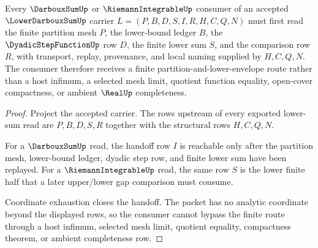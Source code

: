 \begin{theorem}\label{thm:lower-darboux-sum-finite-partition-handoff}
Every $\DarbouxSumUp$ or $\RiemannIntegrableUp$ consumer of an accepted $\LowerDarbouxSumUp$ carrier $L=(P,B,D,S,I,R,H,C,Q,N)$ must first read the finite partition mesh $P$, the lower-bound ledger $B$, the $\DyadicStepFunctionUp$ row $D$, the finite lower sum $S$, and the comparison row $R$, with transport, replay, provenance, and local naming supplied by $H,C,Q,N$. The consumer therefore receives a finite partition-and-lower-envelope route rather than a host infimum, a selected mesh limit, quotient function equality, open-cover compactness, or ambient $\RealUp$ completeness.
\end{theorem}
\begin{proof}
Project the accepted carrier. The rows upstream of every exported lower-sum read are $P,B,D,S,R$ together with the structural rows $H,C,Q,N$.

For a $\DarbouxSumUp$ read, the handoff row $I$ is reachable only after the partition mesh, lower-bound ledger, dyadic step row, and finite lower sum have been replayed. For a $\RiemannIntegrableUp$ read, the same row $S$ is the lower finite half that a later upper/lower gap comparison must consume.

Coordinate exhaustion closes the handoff. The packet has no analytic coordinate beyond the displayed rows, so the consumer cannot bypass the finite route through a host infimum, selected mesh limit, quotient equality, compactness theorem, or ambient completeness row.
\end{proof}

